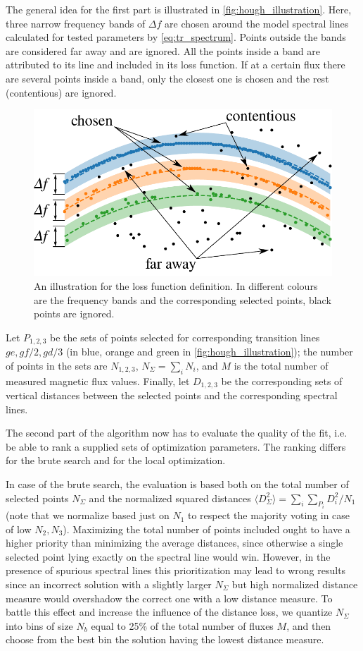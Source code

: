 \documentclass[%
 aip,
 amsmath,amssymb,
 reprint,%
]{revtex4-1}
\begin{document}
The general idea for the first part is illustrated in \autoref{fig:hough_illustration}. Here, three narrow frequency bands of $\Delta f$ are chosen around the model spectral lines calculated for tested parameters by \eqref{eq:tr_spectrum}. Points outside the bands are considered far away and are ignored. All the points inside a band are attributed to its line and included in its loss function. If at a certain flux there are several points inside a band, only the closest one is chosen and the rest (contentious) are ignored. 
\begin{figure}[b]
	\centering
	\includegraphics[width=0.8\linewidth]{hough_illustration}
	\caption{An illustration for the loss function definition. In different colours are the frequency bands and the corresponding selected points, black points are ignored.}
	\label{fig:hough_illustration}
\end{figure}
Let $P_{1,2,3}$ be the sets of points selected for corresponding transition lines $ge, gf/2, gd/3$ (in blue, orange and green in \autoref{fig:hough_illustration}); the number of points in the sets are $N_{1,2,3}$, $N_\Sigma = \sum_i N_i$, and $M$ is the total number of measured magnetic flux values. Finally, let $D_{1,2,3}$ be the corresponding sets of vertical distances between the selected points and the corresponding spectral lines.


The second part of the algorithm now has to evaluate the quality of the fit, i.e. be able to rank a supplied sets of optimization parameters. The ranking differs for the brute search and for the local optimization. 

In case of the brute search, the evaluation is based both on the total number of selected points $N_\Sigma$ and the normalized squared distances $\langle D_\Sigma^2 \rangle  = {\sum_i \sum_{P_i} D_i^2/N_1}$ (note that we normalize based just on $N_1$ to respect the majority voting in case of low $N_2, N_3$). Maximizing the total number of points included ought to have a higher priority than minimizing the average distances, since otherwise a single selected point lying exactly on the spectral line would win. However, in the presence of spurious spectral lines this prioritization may lead to wrong results since an incorrect solution with a slightly larger $N_\Sigma$ but high normalized distance measure would overshadow the correct one with a low distance measure. To battle this effect and increase the influence of the distance loss, we quantize $N_\Sigma$ into bins of size $N_b$ equal to 25\% of the total number of fluxes $M$, and then choose from the best bin the solution having the lowest distance measure. 
\end{document}
